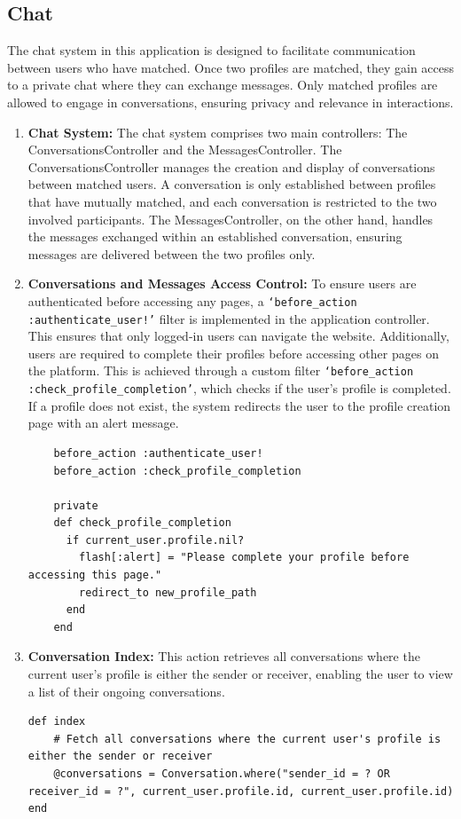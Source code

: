     \subsection{Chat}
    The chat system in this application is designed to facilitate communication between users who have matched. Once two profiles are matched, they gain access to a private chat where they can exchange messages. Only matched profiles are allowed to engage in conversations, ensuring privacy and relevance in interactions.

    \begin{enumerate}
    \item \textbf{Chat System:} 
    The chat system comprises two main controllers: The ConversationsController and the MessagesController. The ConversationsController manages the creation and display of conversations between matched users. A conversation is only established between profiles that have mutually matched, and each conversation is restricted to the two involved participants. The MessagesController, on the other hand, handles the messages exchanged within an established conversation, ensuring messages are delivered between the two profiles only.
    
    \item \textbf{Conversations and Messages Access Control:} 
    To ensure users are authenticated before accessing any pages, a \texttt{`before\_action :authenticate\_user!'} filter is implemented in the application controller. This ensures that only logged-in users can navigate the website. Additionally, users are required to complete their profiles before accessing other pages on the platform. This is achieved through a custom filter \texttt{`before\_action :check\_profile\_completion'}, which checks if the user’s profile is completed. If a profile does not exist, the system redirects the user to the profile creation page with an alert message.
    \begin{lstlisting}
    before_action :authenticate_user!
    before_action :check_profile_completion
    
    private
    def check_profile_completion
      if current_user.profile.nil?
        flash[:alert] = "Please complete your profile before accessing this page."
        redirect_to new_profile_path
      end
    end
    \end{lstlisting}

    \newpage
    \item \textbf{Conversation Index:} 
    This action retrieves all conversations where the current user's profile is either the sender or receiver, enabling the user to view a list of their ongoing conversations.
    \begin{lstlisting}
def index
    # Fetch all conversations where the current user's profile is either the sender or receiver
    @conversations = Conversation.where("sender_id = ? OR receiver_id = ?", current_user.profile.id, current_user.profile.id)
end
    \end{lstlisting}


\end{enumerate}
